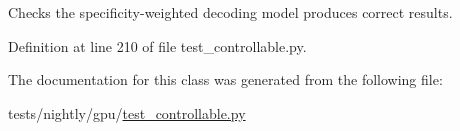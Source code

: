 \begin{DoxyVerb}Checks the specificity-weighted decoding model produces correct results.
\end{DoxyVerb}
 

Definition at line 210 of file test\+\_\+controllable.\+py.



The documentation for this class was generated from the following file\+:\begin{DoxyCompactItemize}
\item 
tests/nightly/gpu/\hyperlink{test__controllable_8py}{test\+\_\+controllable.\+py}\end{DoxyCompactItemize}
